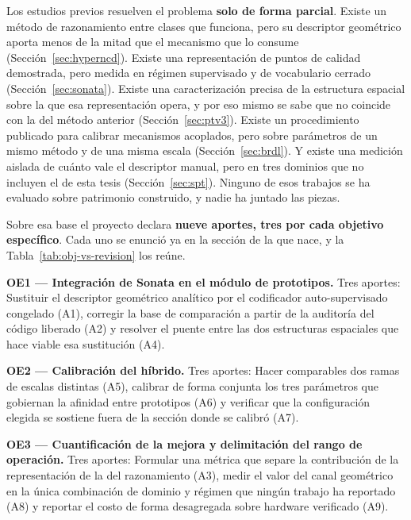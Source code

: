 Los estudios previos resuelven el problema \textbf{solo de forma parcial}. Existe
un método de razonamiento entre clases que funciona, pero su descriptor
geométrico aporta menos de la mitad que el mecanismo que lo consume
(Sección~\ref{sec:hyperncd}). Existe una representación de puntos de calidad
demostrada, pero medida en régimen supervisado y de vocabulario cerrado
(Sección~\ref{sec:sonata}). Existe una caracterización precisa de la estructura
espacial sobre la que esa representación opera, y por eso mismo se sabe que no
coincide con la del método anterior (Sección~\ref{sec:ptv3}). Existe un
procedimiento publicado para calibrar mecanismos acoplados, pero sobre parámetros
de un mismo método y de una misma escala (Sección~\ref{sec:brdl}). Y existe una
medición aislada de cuánto vale el descriptor manual, pero en tres dominios que
no incluyen el de esta tesis (Sección~\ref{sec:spt}). Ninguno de esos trabajos se
ha evaluado sobre patrimonio construido, y nadie ha juntado las piezas.

Sobre esa base el proyecto declara \textbf{nueve aportes, tres por cada objetivo
específico}. Cada uno se enunció ya en la sección de la que nace, y la
Tabla~\ref{tab:obj-vs-revision} los reúne.

\medskip
\noindent\textbf{OE1 --- Integración de Sonata en el módulo de prototipos.}
Tres aportes: Sustituir el descriptor geométrico analítico por el codificador
auto-supervisado congelado (A1), corregir la base de comparación a partir de la
auditoría del código liberado (A2) y resolver el puente entre las dos estructuras
espaciales que hace viable esa sustitución (A4).

\medskip
\noindent\textbf{OE2 --- Calibración del híbrido.} Tres aportes: Hacer comparables
dos ramas de escalas distintas (A5), calibrar de forma conjunta los tres
parámetros que gobiernan la afinidad entre prototipos (A6) y verificar que la
configuración elegida se sostiene fuera de la sección donde se calibró (A7).

\medskip
\noindent\textbf{OE3 --- Cuantificación de la mejora y delimitación del rango de
operación.} Tres aportes: Formular una métrica que separe la contribución de la
representación de la del razonamiento (A3), medir el valor del canal geométrico
en la única combinación de dominio y régimen que ningún trabajo ha reportado (A8)
y reportar el costo de forma desagregada sobre hardware verificado (A9).

